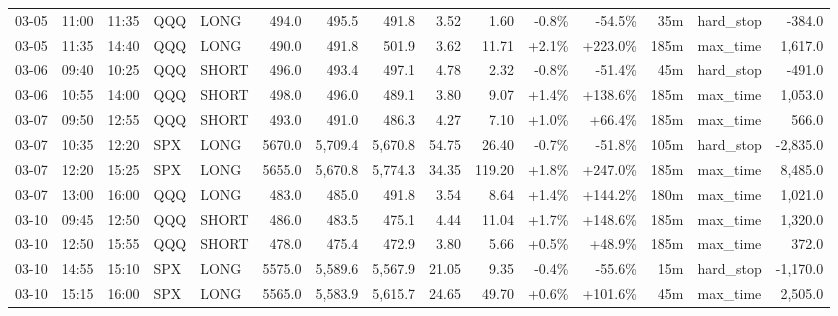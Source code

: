 \documentclass[11pt,a4paper,twoside]{article}
\begin{document}
\begin{landscape}
\begin{center}
\begin{longtable}{>{\color{txtmain}}l l l l l r r r r r r r r >{\color{txtmain}}l r}
03-05 & 11:00 & 11:35 & QQQ & LONG & 494.0 & 495.5 & 491.8 & 3.52 & 1.60 & \textcolor{lossred}{-0.8\%} & \textcolor{lossred}{-54.5\%} & 35m & hard\_stop & \textcolor{lossred}{-384.0} \\
03-05 & 11:35 & 14:40 & QQQ & LONG & 490.0 & 491.8 & 501.9 & 3.62 & 11.71 & \textcolor{wingreen}{+2.1\%} & \textcolor{wingreen}{+223.0\%} & 185m & max\_time & \textcolor{wingreen}{1,617.0} \\
03-06 & 09:40 & 10:25 & QQQ & SHORT & 496.0 & 493.4 & 497.1 & 4.78 & 2.32 & \textcolor{lossred}{-0.8\%} & \textcolor{lossred}{-51.4\%} & 45m & hard\_stop & \textcolor{lossred}{-491.0} \\
03-06 & 10:55 & 14:00 & QQQ & SHORT & 498.0 & 496.0 & 489.1 & 3.80 & 9.07 & \textcolor{wingreen}{+1.4\%} & \textcolor{wingreen}{+138.6\%} & 185m & max\_time & \textcolor{wingreen}{1,053.0} \\
03-07 & 09:50 & 12:55 & QQQ & SHORT & 493.0 & 491.0 & 486.3 & 4.27 & 7.10 & \textcolor{wingreen}{+1.0\%} & \textcolor{wingreen}{+66.4\%} & 185m & max\_time & \textcolor{wingreen}{566.0} \\
03-07 & 10:35 & 12:20 & SPX & LONG & 5670.0 & 5,709.4 & 5,670.8 & 54.75 & 26.40 & \textcolor{lossred}{-0.7\%} & \textcolor{lossred}{-51.8\%} & 105m & hard\_stop & \textcolor{lossred}{-2,835.0} \\
03-07 & 12:20 & 15:25 & SPX & LONG & 5655.0 & 5,670.8 & 5,774.3 & 34.35 & 119.20 & \textcolor{wingreen}{+1.8\%} & \textcolor{wingreen}{+247.0\%} & 185m & max\_time & \textcolor{wingreen}{8,485.0} \\
03-07 & 13:00 & 16:00 & QQQ & LONG & 483.0 & 485.0 & 491.8 & 3.54 & 8.64 & \textcolor{wingreen}{+1.4\%} & \textcolor{wingreen}{+144.2\%} & 180m & max\_time & \textcolor{wingreen}{1,021.0} \\
03-10 & 09:45 & 12:50 & QQQ & SHORT & 486.0 & 483.5 & 475.1 & 4.44 & 11.04 & \textcolor{wingreen}{+1.7\%} & \textcolor{wingreen}{+148.6\%} & 185m & max\_time & \textcolor{wingreen}{1,320.0} \\
03-10 & 12:50 & 15:55 & QQQ & SHORT & 478.0 & 475.4 & 472.9 & 3.80 & 5.66 & \textcolor{wingreen}{+0.5\%} & \textcolor{wingreen}{+48.9\%} & 185m & max\_time & \textcolor{wingreen}{372.0} \\
03-10 & 14:55 & 15:10 & SPX & LONG & 5575.0 & 5,589.6 & 5,567.9 & 21.05 & 9.35 & \textcolor{lossred}{-0.4\%} & \textcolor{lossred}{-55.6\%} & 15m & hard\_stop & \textcolor{lossred}{-1,170.0} \\
03-10 & 15:15 & 16:00 & SPX & LONG & 5565.0 & 5,583.9 & 5,615.7 & 24.65 & 49.70 & \textcolor{wingreen}{+0.6\%} & \textcolor{wingreen}{+101.6\%} & 45m & max\_time & \textcolor{wingreen}{2,505.0} \\

\end{longtable}
\end{center}
\end{landscape}
\end{document}

